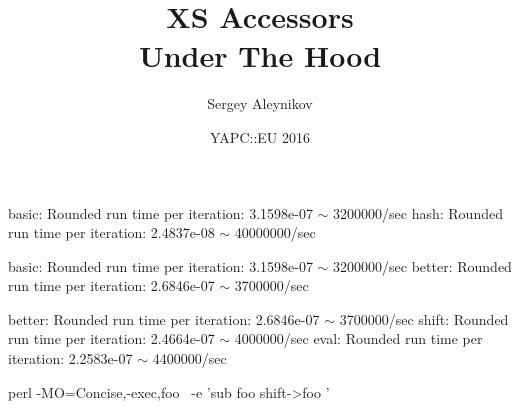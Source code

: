\documentclass[mathserif,hyperref={urlcolor=cyan,colorlinks=true}]{beamer}
\title{XS Accessors\\Under The Hood}
\author{Sergey Aleynikov}
\date[August 2016]{YAPC::EU 2016}
\begin{document}
{

\begin{frame}
\titlepage
\end{frame}

{
\color{white}

\begin{frame}[fragile]
\pause
basic: Rounded run time per iteration: 3.1598e-07 $\sim$ 3200000/sec
hash: Rounded run time per iteration: 2.4837e-08 $\sim$ 40000000/sec
\end{frame}

\begin{frame}[fragile]
\pause
basic: Rounded run time per iteration: 3.1598e-07 $\sim$ 3200000/sec
better: Rounded run time per iteration: 2.6846e-07 $\sim$ 3700000/sec
\end{frame}

\begin{frame}[fragile]
\pause
better: Rounded run time per iteration: 2.6846e-07 $\sim$ 3700000/sec
shift: Rounded run time per iteration: 2.4664e-07 $\sim$ 4000000/sec
eval: Rounded run time per iteration: 2.2583e-07 $\sim$ 4400000/sec
\end{frame}

\begin{frame}[fragile]
\begin{multicols}{2}
\begin{bashcode}
perl -MO=Concise,-exec,foo \
 -e 'sub foo{ shift->{foo} }'


\end{bashcode}
\end{multicols}
\end{frame}}}
\end{document}
